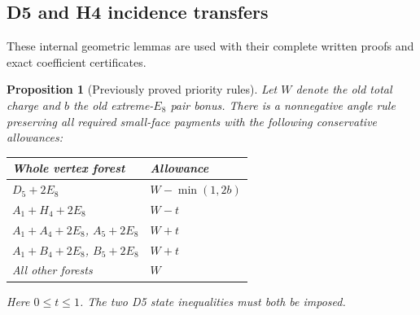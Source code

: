 \documentclass[11pt]{article}
\newtheorem{proposition}[theorem]{Proposition}
\begin{document}
\subsection{D5 and H4 incidence transfers}
These internal geometric lemmas are used with their complete written
proofs and exact coefficient certificates.
\begin{proposition}[Previously proved priority rules]\label{prop:priority}
Let $W$ denote the old total charge and $b$ the old extreme-$E_8$ pair
bonus. There is a nonnegative angle rule preserving all required
small-face payments with the following conservative allowances:
\begin{center}
\begin{tabular}{ll}\toprule
Whole vertex forest&Allowance\\\midrule
$D_5+2E_8$&$W-\min(1,2b)$\\
$A_1+H_4+2E_8$&$W-t$\\
$A_1+A_4+2E_8$, $A_5+2E_8$&$W+t$\\
$A_1+B_4+2E_8$, $B_5+2E_8$&$W+t$\\
All other forests&$W$\\\bottomrule
\end{tabular}
\end{center}
Here $0\le t\le1$. The two D5 state inequalities must both be imposed.
\end{proposition}
\end{document}
